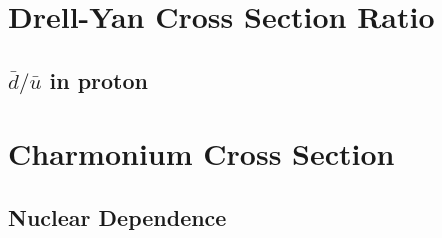 \section{Drell-Yan Cross Section Ratio}

\subsection{\texorpdfstring{$\bar{d}/\bar{u}$}{dbar/ubar} in proton}

\section{Charmonium Cross Section}

\subsection{Nuclear Dependence}
